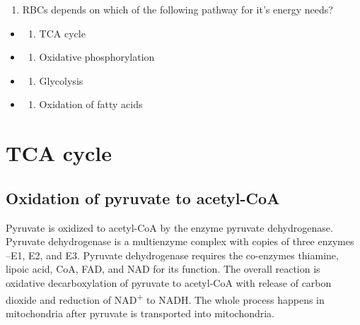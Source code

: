 \documentclass[
]{book}
\providecommand{\tightlist}{%
  \setlength{\itemsep}{0pt}\setlength{\parskip}{0pt}}
\begin{document}
\begin{enumerate}
\def\labelenumi{\arabic{enumi}.}
\setcounter{enumi}{3}
\tightlist
\item
  RBCs depends on which of the following pathway for it's energy needs?
\end{enumerate}

\begin{itemize}
\tightlist
\item
  \begin{enumerate}
  \def\labelenumi{(\Alph{enumi})}
  \tightlist
  \item
    TCA cycle\\
  \end{enumerate}
\item
  \begin{enumerate}
  \def\labelenumi{(\Alph{enumi})}
  \setcounter{enumi}{1}
  \tightlist
  \item
    Oxidative phosphorylation\\
  \end{enumerate}
\item
  \begin{enumerate}
  \def\labelenumi{(\Alph{enumi})}
  \setcounter{enumi}{2}
  \tightlist
  \item
    Glycolysis\\
  \end{enumerate}
\item
  \begin{enumerate}
  \def\labelenumi{(\Alph{enumi})}
  \setcounter{enumi}{3}
  \tightlist
  \item
    Oxidation of fatty acids
  \end{enumerate}
\end{itemize}

\chapter{TCA cycle}\label{tca-cycle}

\section{Oxidation of pyruvate to acetyl-CoA}\label{oxidation-of-pyruvate-to-acetyl-coa}

Pyruvate is oxidized to acetyl-CoA by the enzyme pyruvate dehydrogenase. Pyruvate dehydrogenase is a multienzyme complex with copies of three enzymes --E1, E2, and E3. Pyruvate dehydrogenase requires the co-enzymes thiamine, lipoic acid, CoA, FAD, and NAD for its function. The overall reaction is oxidative decarboxylation of pyruvate to acetyl-CoA with release of carbon dioxide and reduction of NAD\textsuperscript{+} to NADH. The whole process happens in mitochondria after pyruvate is transported into mitochondria.
\end{document}

